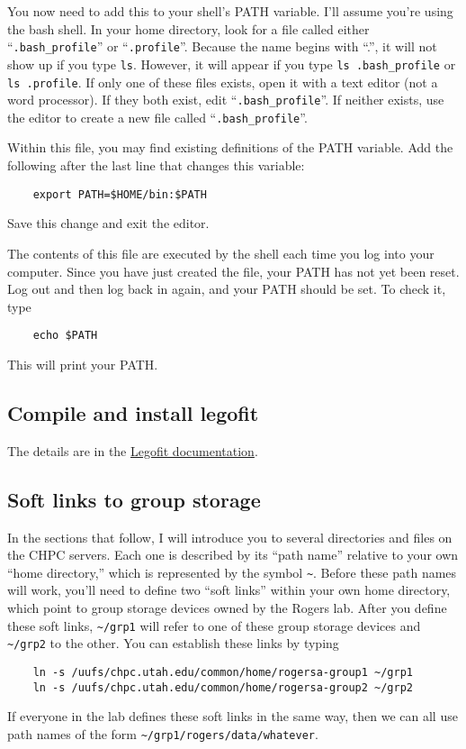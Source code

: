 \documentclass[11pt]{article}
\begin{document}
You now need to add this to your shell's PATH variable. I'll assume
you're using the bash shell. In your home directory, look for a file
called either ``\verb|.bash_profile|'' or
``\texttt{.profile}''. Because the name begins with ``.'', it will not
show up if you type \texttt{ls}. However, it will appear if you type
\verb|ls .bash_profile| or \verb|ls .profile|. If only one of these
files exists, open it with a text editor (not a word processor). If
they both exist, edit ``\verb|.bash_profile|''. If neither exists, use
the editor to create a new file called ``\verb|.bash_profile|''.

Within this file, you may find existing definitions of the PATH
variable. Add the following after the last line that changes this
variable:
\begin{verbatim}
    export PATH=$HOME/bin:$PATH
\end{verbatim}
Save this change and exit the editor.

The contents of this file are executed by the shell each time you log
into your computer. Since you have just created the file, your PATH
has not yet been reset. Log out and then log back in again, and your
PATH should be set. To check it, type
\begin{verbatim}
    echo $PATH
\end{verbatim}
This will print your PATH.

\subsection{Compile and install legofit}
The details are in the
\href{http://alanrogers.github.io/legofit/html/index.html}{Legofit
  documentation}. 

\subsection{Soft links to group storage}
In the sections that follow, I will introduce you to several
directories and files on the CHPC servers. Each one is described by
its ``path name'' relative to your own ``home directory,'' which is
represented by the symbol \verb|~|. Before these path names will work,
you'll need to define two ``soft links'' within your own home
directory, which point to group storage devices owned by the Rogers
lab. After you define these soft links, \verb|~/grp1| will refer to
one of these group storage devices and \verb|~/grp2| to the other. You
can establish these links by typing
\begin{verbatim}
    ln -s /uufs/chpc.utah.edu/common/home/rogersa-group1 ~/grp1
    ln -s /uufs/chpc.utah.edu/common/home/rogersa-group2 ~/grp2
\end{verbatim}
If everyone in the lab defines these soft links in the same way, then
we can all use path names of the form
\verb|~/grp1/rogers/data/whatever|.
\end{document}
